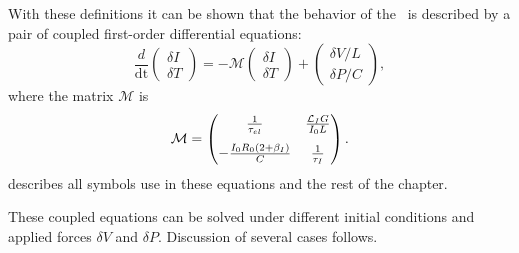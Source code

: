 With these definitions it can be shown\cite{irwin2005transition} that the behavior of the \TES\ is described by a pair of coupled first-order differential equations:
\begin{equation}
\frac{d}{\mathop{dt}} \begin{pmatrix} \delta I \\ \delta T \end{pmatrix}
	= - \mathcal{M} \begin{pmatrix}	\delta I \\	\delta T \end{pmatrix}
      + \begin{pmatrix} \delta V / L \\ \delta P /C \end{pmatrix},
\end{equation}
where the matrix $\mathcal{M}$ is
\begin{equation}
\mathcal{M} = \begin{pmatrix}
		\frac{1}{\tau_{el}} & \frac{\mathcal{L}_I G}{I_0 L} \\[0.75em] 
		-\frac{I_0 R_0(2 + \beta_I)}{C} & \frac{1}{\tau_I}
    \end{pmatrix}.
\end{equation}
 describes all symbols use in these equations and the rest of the chapter.

These coupled equations can be solved under different initial conditions and applied forces $\delta V$ and $\delta P$.
Discussion of several cases follows.

